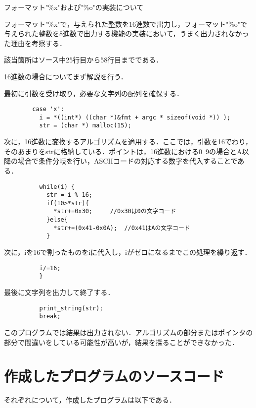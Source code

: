 \documentclass[a4j]{jarticle}
\begin{document}
フォーマット"\%x"および"\%o"の実装について

フォーマット"\%x"で，与えられた整数を16進数で出力し，フォーマット"\%o"で与えられた整数を8進数で出力する機能の実装において，うまく出力されなかった理由を考察する．

該当箇所はソース中25行目から58行目までである．

16進数の場合についてまず解説を行う．

最初に引数を受け取り，必要な文字列の配列を確保する．

\begin{verbatim}
        case 'x':
          i = *((int*) ((char *)&fmt + argc * sizeof(void *)) );
          str = (char *) malloc(15);
\end{verbatim}

次に，16進数に変換するアルゴリズムを適用する．ここでは，引数を16でわり，そのあまりをstrに格納している．ポイントは，16進数における0~9の場合とA以降の場合で条件分岐を行い，ASCIIコードの対応する数字を代入することである．

\begin{verbatim}
          while(i) {
            str = i % 16;
            if(10>*str){
              *str+=0x30;     //0x30は0の文字コード
            }else{
              *str+=(0x41-0x0A);  //0x41はAの文字コード
            }
\end{verbatim}

次に，iを16で割ったものをiに代入し，iがゼロになるまでこの処理を繰り返す．

\begin{verbatim}
          i/=16;
          }
\end{verbatim}

最後に文字列を出力して終了する．

\begin{verbatim}
          print_string(str);
          break;
\end{verbatim}

このプログラムでは結果は出力されない．アルゴリズムの部分またはポインタの部分で間違いをしている可能性が高いが，結果を探ることができなかった．



\newpage

%
%

\section{作成したプログラムのソースコード}

それぞれについて，作成したプログラムは以下である．
\end{document}

